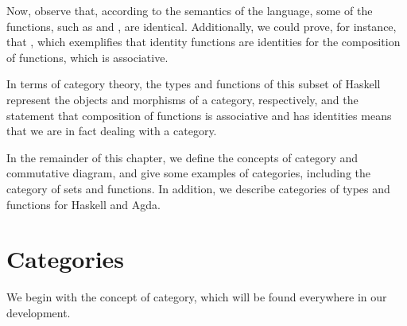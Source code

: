 Now, observe that, according to the semantics of the language, some of
the functions, such as  and
, are identical. Additionally, we could prove, for
instance, that , which
exemplifies that identity functions are identities for the composition
of functions, which is associative.

In terms of category theory, the types and functions of this subset of
Haskell represent the objects and morphisms of a category,
respectively, and the statement that composition of functions is
associative and has identities means that we are in fact dealing with
a category.

In the remainder of this chapter, we define the concepts of category
and commutative diagram, and give some examples of categories,
including the category of sets and functions. In addition, we describe
categories of types and functions for Haskell and Agda.

\section{Categories}
\label{sec:categories}

We begin with the concept of category, which will be found everywhere
in our development.

